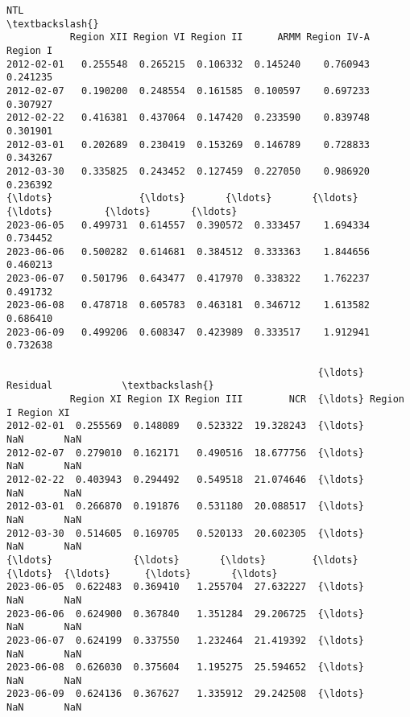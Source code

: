 \documentclass[11pt]{article}
\makeatletter
\newcommand{\boxspacing}{\kern\kvtcb@left@rule\kern\kvtcb@boxsep}
\newcommand{\prompt}[4]{
        {\ttfamily\llap{{\color{#2}[#3]:\hspace{3pt}#4}}\vspace{-\baselineskip}}
    }
\makeatother
\begin{document}
            \begin{tcolorbox}[breakable, size=fbox, boxrule=.5pt, pad at break*=1mm, opacityfill=0]
\prompt{Out}{outcolor}{53}{\boxspacing}
\begin{Verbatim}[commandchars=\\\{\}]
                  NTL                                                      \textbackslash{}
           Region XII Region VI Region II      ARMM Region IV-A  Region I
2012-02-01   0.255548  0.265215  0.106332  0.145240    0.760943  0.241235
2012-02-07   0.190200  0.248554  0.161585  0.100597    0.697233  0.307927
2012-02-22   0.416381  0.437064  0.147420  0.233590    0.839748  0.301901
2012-03-01   0.202689  0.230419  0.153269  0.146789    0.728833  0.343267
2012-03-30   0.335825  0.243452  0.127459  0.227050    0.986920  0.236392
{\ldots}               {\ldots}       {\ldots}       {\ldots}       {\ldots}         {\ldots}       {\ldots}
2023-06-05   0.499731  0.614557  0.390572  0.333457    1.694334  0.734452
2023-06-06   0.500282  0.614681  0.384512  0.333363    1.844656  0.460213
2023-06-07   0.501796  0.643477  0.417970  0.338322    1.762237  0.491732
2023-06-08   0.478718  0.605783  0.463181  0.346712    1.613582  0.686410
2023-06-09   0.499206  0.608347  0.423989  0.333517    1.912941  0.732638

                                                      {\ldots} Residual            \textbackslash{}
           Region XI Region IX Region III        NCR  {\ldots} Region I Region XI
2012-02-01  0.255569  0.148089   0.523322  19.328243  {\ldots}      NaN       NaN
2012-02-07  0.279010  0.162171   0.490516  18.677756  {\ldots}      NaN       NaN
2012-02-22  0.403943  0.294492   0.549518  21.074646  {\ldots}      NaN       NaN
2012-03-01  0.266870  0.191876   0.531180  20.088517  {\ldots}      NaN       NaN
2012-03-30  0.514605  0.169705   0.520133  20.602305  {\ldots}      NaN       NaN
{\ldots}              {\ldots}       {\ldots}        {\ldots}        {\ldots}  {\ldots}      {\ldots}       {\ldots}
2023-06-05  0.622483  0.369410   1.255704  27.632227  {\ldots}      NaN       NaN
2023-06-06  0.624900  0.367840   1.351284  29.206725  {\ldots}      NaN       NaN
2023-06-07  0.624199  0.337550   1.232464  21.419392  {\ldots}      NaN       NaN
2023-06-08  0.626030  0.375604   1.195275  25.594652  {\ldots}      NaN       NaN
2023-06-09  0.624136  0.367627   1.335912  29.242508  {\ldots}      NaN       NaN


\end{Verbatim}
\end{tcolorbox}
\end{document}
